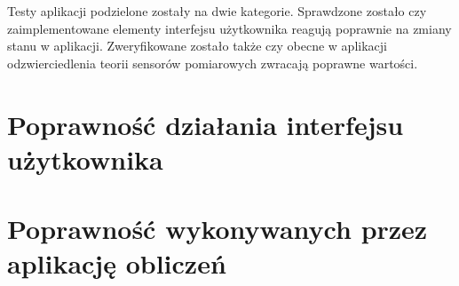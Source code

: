 Testy aplikacji podzielone zostały na dwie kategorie. Sprawdzone zostało czy zaimplementowane
elementy interfejsu użytkownika reagują poprawnie na zmiany stanu w aplikacji. Zweryfikowane zostało
także czy obecne w aplikacji odzwierciedlenia teorii sensorów pomiarowych zwracają poprawne
wartości.

\section{Poprawność działania interfejsu użytkownika}


\section{Poprawność wykonywanych przez aplikację obliczeń}
